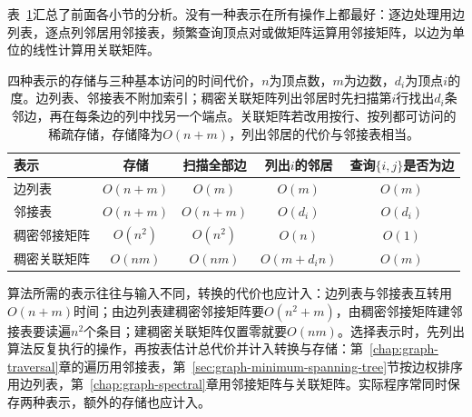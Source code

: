 表~\ref{tab:graph-conn-representation-costs}汇总了前面各小节的分析。没有一种表示在所有操作上都最好：逐边处理用边列表，逐点列邻居用邻接表，频繁查询顶点对或做矩阵运算用邻接矩阵，以边为单位的线性计算用关联矩阵。

\begin{table}[!htb]
  \centering\small
  \begin{tabular}{@{}lcccc@{}}
    \toprule
    表示 & 存储 & 扫描全部边 & 列出$i$的邻居 & 查询$\{i,j\}$是否为边\\
    \midrule
    边列表 & $O(n+m)$ & $O(m)$ & $O(m)$ & $O(m)$\\
    邻接表 & $O(n+m)$ & $O(n+m)$ & $O(d_i)$ & $O(d_i)$\\
    稠密邻接矩阵 & $O(n^2)$ & $O(n^2)$ & $O(n)$ & $O(1)$\\
    稠密关联矩阵 & $O(nm)$ & $O(nm)$ & $O(m+d_in)$ & $O(m)$\\
    \bottomrule
  \end{tabular}
  \caption{四种表示的存储与三种基本访问的时间代价，$n$为顶点数，$m$为边数，$d_i$为顶点$i$的度。边列表、邻接表不附加索引；稠密关联矩阵列出邻居时先扫描第$i$行找出$d_i$条邻边，再在每条边的列中找另一个端点。关联矩阵若改用按行、按列都可访问的稀疏存储，存储降为$O(n+m)$，列出邻居的代价与邻接表相当。}
  \label{tab:graph-conn-representation-costs}
\end{table}

算法所需的表示往往与输入不同，转换的代价也应计入：边列表与邻接表互转用$O(n+m)$时间；由边列表建稠密邻接矩阵要$O(n^2+m)$，由稠密邻接矩阵建邻接表要读遍$n^2$个条目；建稠密关联矩阵仅置零就要$O(nm)$。选择表示时，先列出算法反复执行的操作，再按表估计总代价并计入转换与存储：第~\ref{chap:graph-traversal}章的遍历用邻接表，第~\ref{sec:graph-minimum-spanning-tree}节按边权排序用边列表，第~\ref{chap:graph-spectral}章用邻接矩阵与关联矩阵。实际程序常同时保存两种表示，额外的存储也应计入。
